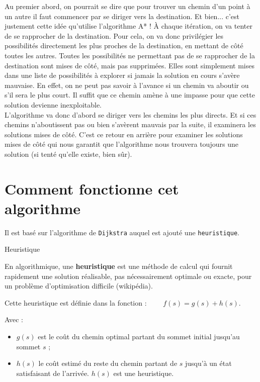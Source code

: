 Au premier abord, on pourrait se dire que pour trouver un chemin d'un point à un autre il faut commencer par se diriger vers la destination. Et bien... c'est justement cette idée qu'utilise l'algorithme A* ! À chaque itération, on va tenter de se rapprocher de la destination. Pour cela, on va donc privilégier les possibilités directement les plus proches de la destination, en mettant de côté toutes les autres. Toutes les possibilités ne permettant pas de se rapprocher de la destination sont mises de côté, mais pas supprimées. Elles
sont simplement mises dans une liste de possibilités à explorer si jamais la solution en cours s'avère mauvaise.
En effet, on ne peut pas savoir à l'avance si un chemin va aboutir ou s'il sera le plus court. Il suffit que ce chemin amène à une impasse pour que cette solution devienne inexploitable.\\
L'algorithme va donc d'abord se diriger vers les chemins les plus directs. Et si ces chemins n'aboutissent pas ou bien s'avèrent mauvais par la suite, il examinera les solutions mises de côté. C'est ce retour en arrière pour examiner les solutions mises de côté qui nous garantit que l'algorithme nous trouvera toujours une solution (si
tenté qu'elle existe, bien sûr).



\section{Comment fonctionne cet algorithme}

Il est basé sur l'algorithme de \texttt{Dijkstra} auquel est ajouté une \texttt{heuristique}.


\begin{defi} {Heuristique}

En algorithmique, une \textbf{heuristique} est une méthode de calcul qui fournit rapidement une solution réalisable, pas nécessairement optimale ou exacte, pour un problème d'optimisation difficile (wikipédia).

Cette heuristique est définie dans la fonction : $\quad \quad f(s)=g(s)+h(s) $.

Avec :
\begin{itemize}
\item $g(s)$ est le coût du chemin optimal partant du sommet initial jusqu'au sommet $s$ ;
\item $h(s)$ le coût estimé du reste du chemin partant de $s$ jusqu'à un état satisfaisant de l'arrivée. $h(s)$ est une heuristique.
\end{itemize}

\end{defi}

